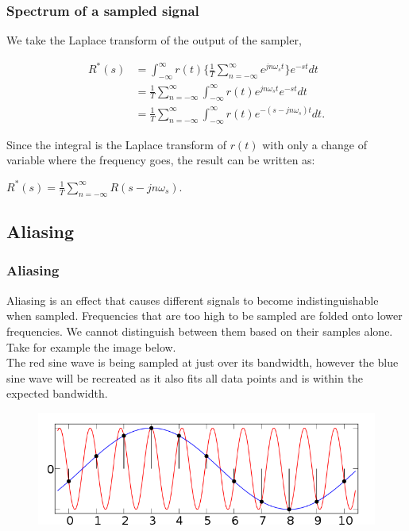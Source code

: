 \begin{frame}
	\frametitle{Spectrum of a sampled signal}
	We take the Laplace transform of the output of the sampler,
	\vspace{-2ex}
	\begin{center}
		\begin{equation}
			\begin{split}
			R^*(s)& = \int_{-\infty}^{\infty} r(t) \Big\{ \frac{1}{T} \sum_{n=-\infty}^{\infty} e^{jn\omega_st} \Big\} e^{-st} dt\\
			& = \frac{1}{T} \sum_{n=-\infty}^{\infty} \int_{-\infty}^{\infty} r(t) e^{jn\omega_st}e^{-st}dt\\
			& = \frac{1}{T} \sum_{n=-\infty}^{\infty} \int_{-\infty}^{\infty}r(t) e^{-(s-jn\omega_s)t} dt.
			\end{split}
		\end{equation}
	\end{center}
	Since the integral is the Laplace transform of $r(t)$ with only a change of variable where the frequency goes, the result can be written as:\\
	\begin{center}
		$R^*(s)=\frac{1}{T}\sum_{n=-\infty}^{\infty}R(s-jn\omega_s)$.
	\end{center}
\end{frame}

\subsection{Aliasing}

\begin{frame}
	\frametitle{Aliasing}
	Aliasing is	an effect that causes different signals to become indistinguishable when sampled. Frequencies that are too high to be sampled are folded onto lower frequencies. We cannot distinguish between them based on their samples alone.\\
	\medskip
	Take for example the image below.\\
	The red sine wave is being sampled at just over its bandwidth, however the blue sine wave will be recreated as it also fits all data points and is within the expected bandwidth.
	\begin{figure}
		\includegraphics[width=0.8\linewidth]{aliasing}
	\end{figure}
\end{frame}

